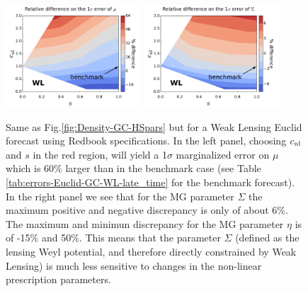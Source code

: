 \begin{figure}[htbp]
\centering{}
\includegraphics[width=0.45\textwidth]{Chapters/linear-nonlinear-MG-forecasts/figures/DensityPlots/WL-Zhao-effect-mu.pdf}
\includegraphics[width=0.45\textwidth]{Chapters/linear-nonlinear-MG-forecasts/figures/DensityPlots/WL-Zhao-effect-Sigma.pdf}
\caption[Effect of the HS non-linear prescription on parameter estimation for WL in MG.]{\label{fig:Density-WL-HSpars}
Same as Fig.\ref{fig:Density-GC-HSpars} but for a Weak Lensing Euclid forecast using Redbook specifications.
In the left panel, choosing $c_{\mathrm{nl}}$
and $s$ in the red region, will yield a 1$\sigma$ marginalized
error on $\mu$ which is 60\% larger than in the benchmark case
(see Table \ref{tab:errors-Euclid-GC-WL-late_time}
for the benchmark forecast). In the right panel we see that for the MG parameter $\Sigma$ the maximum positive and negative discrepancy
is only of about 6\%. The maximum and minimun discrepancy for the MG parameter $\eta$ is of -15\% and 50\%. This means that
the parameter $\Sigma$ (defined as the lensing Weyl potential, and therefore directly constrained by Weak Lensing) 
is much less sensitive to changes in the non-linear prescription parameters.}
\end{figure}


